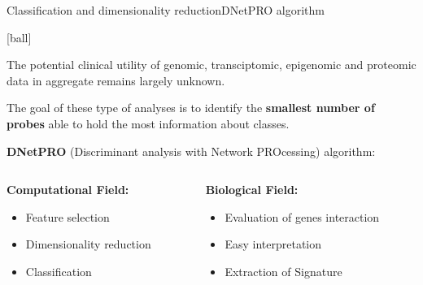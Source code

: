 \documentclass{standalone}
\begin{document}
\begin{frame}{Classification and dimensionality reduction}{DNetPRO algorithm}

  [ball]

  The potential clinical utility of genomic, transciptomic, epigenomic and proteomic data in aggregate remains largely unknown.

  The goal of these type of analyses is to identify the \textbf{smallest number of probes} able to hold the most information about classes.

  \vspace{.5cm}

  \textbf{DNetPRO} (Discriminant analysis with Network PROcessing) algorithm:

  \vspace{1cm}

  \begin{columns}

    \begin{column}{0.5\linewidth}

      \textbf{Computational Field:}

      \begin{itemize}
        \item Feature selection
        \item Dimensionality reduction
        \item Classification
      \end{itemize}

    \end{column}

    \begin{column}{0.5\linewidth}

      \textbf{Biological Field:}

      \begin{itemize}
        \item Evaluation of genes interaction
        \item Easy interpretation
        \item Extraction of Signature
      \end{itemize}

    \end{column}

  \end{columns}

\end{frame}

\end{document}
